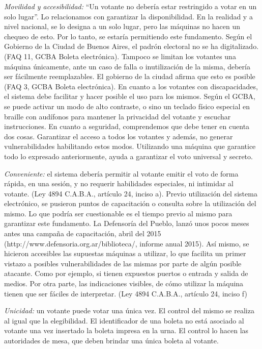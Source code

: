 \textit{Movilidad y accesibilidad:} “Un votante no debería estar restringido a votar en un solo lugar”. Lo relacionamos con garantizar la disponibilidad. En la realidad y a nivel nacional, se lo designa a un solo lugar, pero las máquinas no hacen un chequeo de esto. Por lo tanto, se estaría permitiendo este fundamento. Según el Gobierno de la Ciudad de Buenos Aires, el padrón electoral no se ha digitalizado. (FAQ 11, GCBA Boleta electrónica). Tampoco se limitan los votantes una máquina únicamente, ante un caso de falla o inutilización de la misma, debería ser fácilmente reemplazables. El gobierno de la ciudad afirma que esto es posible (FAQ 3, GCBA Boleta electrónica).
En cuanto a los votantes con discapacidades, el sistema debe facilitar y hacer posible el uso para los mismos. Según el GCBA, se puede activar un modo de alto contraste, o sino un teclado físico especial en braille con audífonos para mantener la privacidad del votante y escuchar instrucciones. En cuanto a seguridad, comprendemos que debe tener en cuenta dos cosas. Garantizar el acceso a todos los votantes y además, no generar vulnerabilidades habilitando estos modos. Utilizando una máquina que garantice todo lo expresado anteriormente, ayuda a garantizar el voto universal y secreto. 

\textit{Conveniente:} el sistema debería permitir al votante emitir el voto de forma rápida, en una sesión, y no requerir habilidades especiales, ni intimidar al votante. (Ley 4894 C.A.B.A., artículo 24, inciso a). Previo utilización del sistema electrónico, se pusieron puntos de capacitación o consulta sobre la utilización del mismo. Lo que podría ser cuestionable es el tiempo previo al mismo para garantizar este fundamento. La Defensoría del Pueblo, lanzó unos pocos meses antes una campaña de capacitación, abril del 2015 (http://www.defensoria.org.ar/biblioteca/, informe anual 2015). Así mismo, se hicieron accesibles las supuestas máquinas a utilizar, lo que facilita un primer vistazo a posibles vulnerabilidades de las mismas por parte de algún posible atacante. Como por ejemplo, si tienen expuestos puertos o entrada y salida de medios. Por otra parte, las indicaciones visibles, de cómo utilizar la máquina tienen que ser fáciles de interpretar. (Ley 4894 C.A.B.A., artículo 24, inciso f)

\textit{Unicidad:} un votante puede votar una única vez. El control del mismo se realiza al igual que la elegibilidad. El identificador de una boleta no está asociado al votante una vez insertado la boleta impresa en la urna. El control lo hacen las autoridades de mesa, que deben brindar una única boleta al votante.

